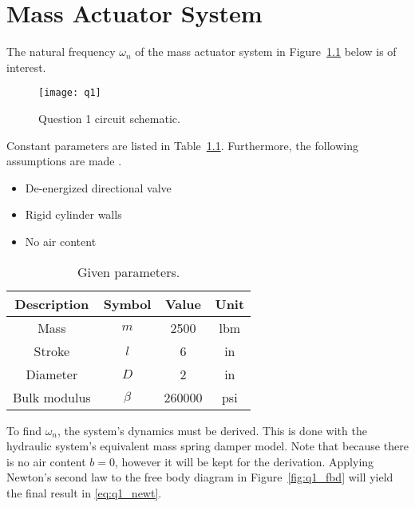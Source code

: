 \chapter{Mass Actuator System}
\label{chap:q1}

The natural frequency $\omega_n$ of the mass actuator system in Figure~\ref{fig:q1} \cite{assign} below is of interest.

\begin{figure}[H]
	\centering
	\texttt{[image: q1]}
	\caption{Question 1 circuit schematic.}
	\label{fig:q1}
\end{figure}

Constant parameters are listed in Table~\ref{tab:q1_param}. Furthermore, the following assumptions are made \cite{assign}.
\begin{itemize}
	\item De-energized directional valve
	\item Rigid cylinder walls
	\item No air content
\end{itemize}

\begin{table}[H]
	\centering
	\caption{Given parameters.}
	\begin{tabular}{cccc}
		\toprule
		\textbf{Description} & \textbf{Symbol} & \textbf{Value } & \textbf{Unit} \\
		\midrule
		Mass                 & $m$             & 2500            & lbm           \\
		Stroke               & $l$             & 6               & in            \\
		Diameter             & $D$             & 2               & in            \\
		Bulk modulus         & $\beta$         & 260000          & psi           \\
		\bottomrule    
	\end{tabular}
	\label{tab:q1_param}
\end{table}

To find $\omega_n$, the system's dynamics must be derived. This is done with the hydraulic system's equivalent mass spring damper model. Note that because there is no air content  $b=0$, however it will be kept for the derivation. Applying Newton's second law to the free body diagram in Figure~\ref{fig:q1_fbd} will yield the final result in \ref{eq:q1_newt}.

